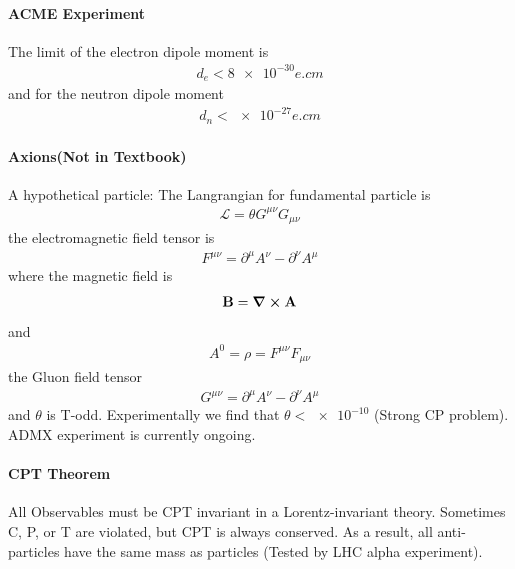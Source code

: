 \documentclass[../main.tex]{subfiles}
\begin{document}
\paragraph*{ACME Experiment} The limit of the electron dipole moment is
\begin{align*}
    d_e < \num{8e-30}{e.cm}
\end{align*}
and for the neutron dipole moment
\begin{align*}
    d_n < \num{e-27}{e.cm}
\end{align*}

\paragraph*{Axions(Not in Textbook)} A hypothetical particle: The Langrangian for fundamental
particle is
\begin{align*}
    \mathcal{L} = \theta G^{\mu\nu} G_{\mu\nu}
\end{align*}
the electromagnetic field tensor is
\begin{align*}
    F^{\mu\nu} = \partial^\mu A^\nu - \partial^\nu A^\mu
\end{align*}
where the magnetic field is
\begin{align*}
    \vb B = \curl \vb A
\end{align*}
and
\begin{align*}
    A^0 = \rho = F^{\mu\nu} F_{\mu\nu} 
\end{align*}
the Gluon field tensor
\begin{align*}
    G^{\mu\nu} = \partial^\mu A^\nu - \partial^\nu A^\mu
\end{align*}
and $\theta$ is T-odd. Experimentally we find that $\theta < \num{e-10}$ (Strong CP problem). ADMX
experiment is currently ongoing. 

\paragraph*{CPT Theorem} All Observables must be CPT invariant in a Lorentz-invariant theory.
Sometimes C, P, or T are violated, but CPT is always conserved. As a result, all anti-particles have
the same mass as particles (Tested by LHC alpha experiment).
\end{document}

